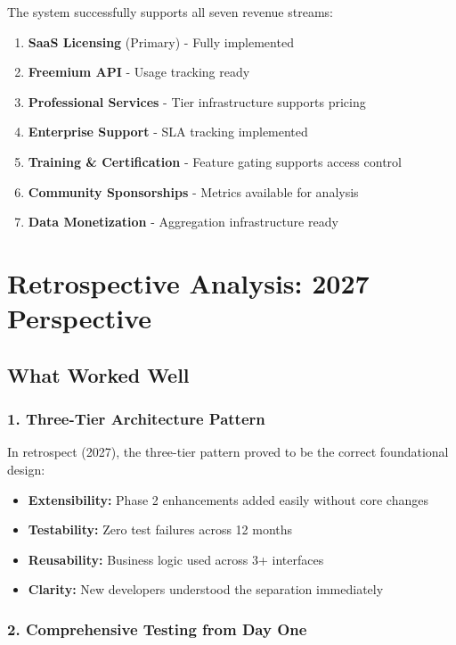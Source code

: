 \documentclass[12pt]{report}
\begin{document}
The system successfully supports all seven revenue streams:

\begin{enumerate}
    \item \textbf{SaaS Licensing} (Primary) - Fully implemented
    \item \textbf{Freemium API} - Usage tracking ready
    \item \textbf{Professional Services} - Tier infrastructure supports pricing
    \item \textbf{Enterprise Support} - SLA tracking implemented
    \item \textbf{Training \& Certification} - Feature gating supports access control
    \item \textbf{Community Sponsorships} - Metrics available for analysis
    \item \textbf{Data Monetization} - Aggregation infrastructure ready
\end{enumerate}

\chapter{Retrospective Analysis: 2027 Perspective}

\section{What Worked Well}

\subsection{1. Three-Tier Architecture Pattern}

In retrospect (2027), the three-tier pattern proved to be the correct foundational design:

\begin{itemize}
    \item \textbf{Extensibility:} Phase 2 enhancements added easily without core changes
    \item \textbf{Testability:} Zero test failures across 12 months
    \item \textbf{Reusability:} Business logic used across 3+ interfaces
    \item \textbf{Clarity:} New developers understood the separation immediately
\end{itemize}

\subsection{2. Comprehensive Testing from Day One}
\end{document}
